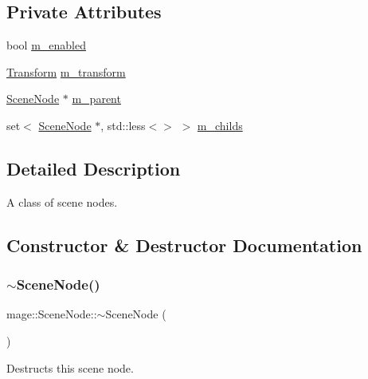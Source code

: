 \subsection*{Private Attributes}
\begin{DoxyCompactItemize}
\item 
bool \hyperlink{classmage_1_1_scene_node_a886a097067e1aa22b7803aaf2f5ccbf0}{m\+\_\+enabled}
\item 
\hyperlink{structmage_1_1_transform}{Transform} \hyperlink{classmage_1_1_scene_node_af1384e71b5cc527df881c7272e9fa518}{m\+\_\+transform}
\item 
\hyperlink{classmage_1_1_scene_node}{Scene\+Node} $\ast$ \hyperlink{classmage_1_1_scene_node_a507db45672f28f899f6c7b0f6a292202}{m\+\_\+parent}
\item 
set$<$ \hyperlink{classmage_1_1_scene_node}{Scene\+Node} $\ast$, std\+::less$<$$>$ $>$ \hyperlink{classmage_1_1_scene_node_afd031fb3c5ae4cef203fe8c85be0187e}{m\+\_\+childs}
\end{DoxyCompactItemize}


\subsection{Detailed Description}
A class of scene nodes. 

\subsection{Constructor \& Destructor Documentation}
\hypertarget{classmage_1_1_scene_node_a6705beea9c535de3d495762ed06e74dd}{}\label{classmage_1_1_scene_node_a6705beea9c535de3d495762ed06e74dd} 
\subsubsection{\texorpdfstring{$\sim$\+Scene\+Node()}{~SceneNode()}}
{\footnotesize\ttfamily mage\+::\+Scene\+Node\+::$\sim$\+Scene\+Node (\begin{DoxyParamCaption}{ }\end{DoxyParamCaption})\hspace{0.3cm}{\ttfamily [virtual]}}

Destructs this scene node. \hypertarget{classmage_1_1_scene_node_a3cf69b4acd80f1e4452e603e9c713cbf}{}\label{classmage_1_1_scene_node_a3cf69b4acd80f1e4452e603e9c713cbf} 
